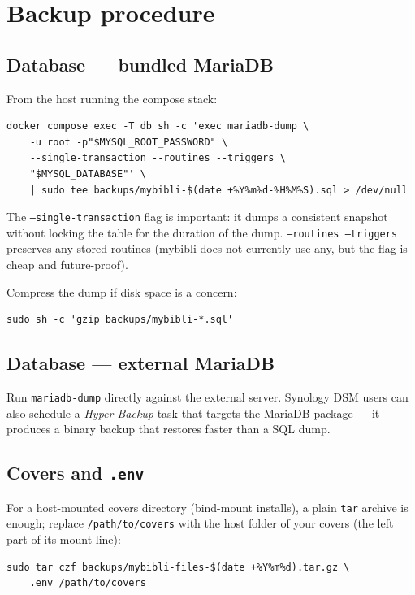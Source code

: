 \section{Backup procedure}

\subsection*{Database — bundled MariaDB}

From the host running the compose stack:

\begin{lstlisting}
docker compose exec -T db sh -c 'exec mariadb-dump \
    -u root -p"$MYSQL_ROOT_PASSWORD" \
    --single-transaction --routines --triggers \
    "$MYSQL_DATABASE"' \
    | sudo tee backups/mybibli-$(date +%Y%m%d-%H%M%S).sql > /dev/null
\end{lstlisting}

The \texttt{--single-transaction} flag is important: it dumps a
consistent snapshot without locking the table for the duration of
the dump. \texttt{--routines --triggers} preserves any stored
routines (mybibli does not currently use any, but the flag is cheap
and future-proof).

Compress the dump if disk space is a concern:

\begin{lstlisting}
sudo sh -c 'gzip backups/mybibli-*.sql'
\end{lstlisting}

\subsection*{Database — external MariaDB}

Run \texttt{mariadb-dump} directly against the external server.
Synology DSM users can also schedule a \emph{Hyper Backup} task that
targets the MariaDB package — it produces a binary backup that
restores faster than a SQL dump.

\subsection*{Covers and \texttt{.env}}

For a host-mounted covers directory (bind-mount installs), a plain
\texttt{tar} archive is enough; replace \texttt{/path/to/covers} with
the host folder of your covers (the left part of its mount line):

\begin{lstlisting}
sudo tar czf backups/mybibli-files-$(date +%Y%m%d).tar.gz \
    .env /path/to/covers
\end{lstlisting}

